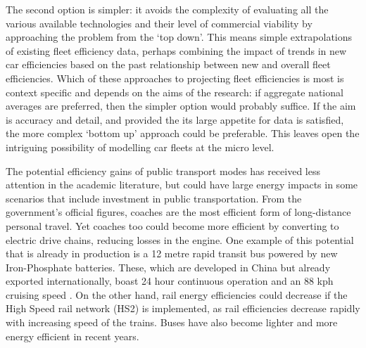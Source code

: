\documentclass[a4paper, 11pt, twoside]{Thesis}
\begin{document}
The second option is simpler: it avoids the complexity of
evaluating all the various available technologies and their level of
commercial viability by approaching the problem from the `top down'. This
means simple extrapolations of existing fleet efficiency data, perhaps
combining the impact of trends in new car efficiencies based on the past
relationship between new and overall fleet efficiencies. Which of these
approaches to projecting fleet efficiencies is most is context specific and
depends on the aims of the research:
if aggregate national averages are preferred, then the simpler option would
probably suffice. If the aim is accuracy and detail, and provided the
its large appetite for data is satisfied, the more complex `bottom up'
approach could be preferable. This leaves open the intriguing possibility of
modelling car fleets at the micro level. 

The potential efficiency gains of public transport modes has received less
attention in the academic literature, but could have large energy impacts
in some scenarios that include investment in public transportation.
From the government's official figures, coaches are the most efficient
form of long-distance personal travel. Yet coaches too could become
more efficient by converting to electric drive chains, reducing losses
in the engine. One example of this potential that is already in production
is a 12 metre rapid transit bus powered by new Iron-Phosphate batteries.
These, which are developed in China but already exported internationally,
boast 24 hour continuous operation and an 88 kph cruising speed
\citep{BreakingTravelNews}. On the other hand, rail energy efficiencies could
decrease if the High Speed rail network (HS2) is implemented, as
rail efficiencies decrease rapidly with increasing speed of the trains.
Buses have also become lighter and more
energy efficient in recent years.
\end{document}
